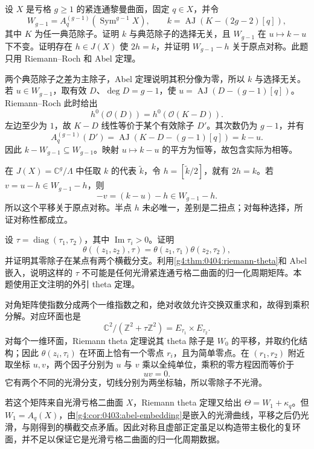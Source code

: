 \begin{exercise}
	\label{g4:ex:0404:residual-symmetry}
	设 \(X\) 是亏格 \(g\ge1\) 的紧连通黎曼曲面，固定 \(q\in X\)，并令
	\[
		W_{g-1}=A_q^{(g-1)}(\operatorname{Sym}^{g-1}X),\qquad
		k=\operatorname{AJ}(K-(2g-2)[q]),
	\]
	其中 \(K\) 为任一典范除子。证明 \(k\) 与典范除子的选择无关，且 \(W_{g-1}\) 在 \(u\mapsto k-u\) 下不变。证明存在 \(h\in J(X)\) 使 \(2h=k\)，并证明 \(W_{g-1}-h\) 关于原点对称。此题只用 Riemann--Roch 和 Abel 定理。
\end{exercise}
\begin{solution}
	两个典范除子之差为主除子，Abel 定理说明其积分像为零，所以 \(k\) 与选择无关。若 \(u\in W_{g-1}\)，取有效 \(D\)、\(\deg D=g-1\)，使 \(u=\operatorname{AJ}(D-(g-1)[q])\)。Riemann--Roch 此时给出
	\[
		h^0(\mathcal O(D))=h^0(\mathcal O(K-D)).
	\]
	左边至少为 \(1\)，故 \(K-D\) 线性等价于某个有效除子 \(D'\)。其次数仍为 \(g-1\)，并有
	\[
		A_q^{(g-1)}(D')
		=\operatorname{AJ}(K-D-(g-1)[q])=k-u.
	\]
	因此 \(k-W_{g-1}\subseteq W_{g-1}\)。映射 \(u\mapsto k-u\) 的平方为恒等，故包含实际为相等。

	在 \(J(X)=\mathbb C^g/\Lambda\) 中任取 \(k\) 的代表 \(\widetilde k\)，令 \(h=[\widetilde k/2]\)，就有 \(2h=k\)。若 \(v=u-h\in W_{g-1}-h\)，则
	\[
		-v=(k-u)-h\in W_{g-1}-h.
	\]
	所以这个平移关于原点对称。半点 \(h\) 未必唯一，差别是二扭点；对每种选择，所证对称性都成立。
\end{solution}

\begin{exercise}
	\label{g4:ex:0404:diagonal-period}
	设 \(\tau=\operatorname{diag}(\tau_1,\tau_2)\)，其中 \(\operatorname{Im}\tau_i>0\)。证明
	\[
		\theta((z_1,z_2),\tau)=\theta(z_1,\tau_1)\theta(z_2,\tau_2),
	\]
	并证明其零除子在某点有两个横截分支。利用\cref{g4:thm:0404:riemann-theta}和 Abel 嵌入，说明这样的 \(\tau\) 不可能是任何光滑紧连通亏格二曲面的归一化周期矩阵。本题使用正文注明的外引 theta 定理。
\end{exercise}
\begin{solution}
	对角矩阵使指数分成两个一维指数之和，绝对收敛允许交换双重求和，故得到乘积分解。对应环面也是
	\[
		\mathbb C^2/(\mathbb Z^2+\tau\mathbb Z^2)
		=E_{\tau_1}\times E_{\tau_2}.
	\]
	对每个一维环面，Riemann theta 定理说其 theta 除子是 \(W_0\) 的平移，并取约化结构；因此 \(\theta(z_i,\tau_i)\) 在环面上恰有一个零点 \(r_i\)，且为简单零点。在 \((r_1,r_2)\) 附近取坐标 \(u,v\)，两个因子分别为 \(u\) 与 \(v\) 乘以全纯单位，乘积的零方程因而等价于
	\[
		uv=0.
	\]
	它有两个不同的光滑分支，切线分别为两坐标轴，所以零除子不光滑。

	若这个矩阵来自光滑亏格二曲面 \(X\)，Riemann theta 定理又给出 \(\Theta=W_1+\kappa_q\)。但 \(W_1=A_q(X)\)，由\cref{g4:cor:0403:abel-embedding}是嵌入的光滑曲线，平移之后仍光滑，与刚得到的横截交点矛盾。因此对称且虚部正定虽足以构造带主极化的复环面，并不足以保证它是光滑亏格二曲面的归一化周期数据。
\end{solution}

